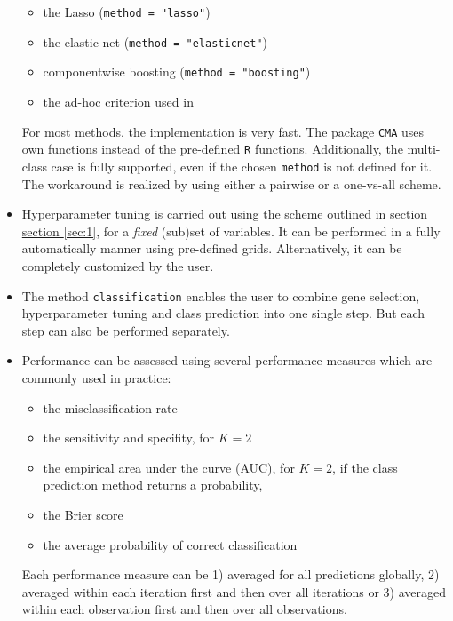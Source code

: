 \begin{itemize}
\begin{itemize}
      \item the Lasso (\texttt{method = "lasso"})
      \item the elastic net (\texttt{method = "elasticnet"}) 
      \item componentwise boosting (\texttt{method = "boosting"})                               
      \item the ad-hoc criterion used in \citet{golub1999}                                
      \end{itemize}                                
      For most methods, the implementation is very fast. The package 
     \texttt{CMA} uses own functions instead of the pre-defined
      \texttt{R} functions.
      Additionally, the multi-class case is fully supported, even if the chosen
      \texttt{method} is not defined for it. The workaround is realized by using
      either a pairwise or a one-vs-all scheme. 
\item Hyperparameter tuning is carried out using the scheme outlined in section 
      \hyperref[sec:1]{section }{\ref{sec:1}},
      for a \emph{fixed} (sub)set of variables. 
	It can be performed in a fully automatically
      manner using pre-defined grids. Alternatively, it can 
	be completely customized by the user. 
\item The method \texttt{classification} enables the user to combine gene selection,
      hyperparameter tuning and class prediction into one single step. But each step
	can also be performed separately.
\item Performance can be assessed using several performance measures
	which are commonly used in practice: 
      \begin{itemize}
      \item the misclassification rate                                         
      \item the sensitivity and specifity, for $K=2$
      \item the empirical area under the curve (AUC), for $K=2$, if the class 
	prediction method returns a probability,
      \item the Brier score
      \item the average probability of correct classification                                
      \end{itemize}                          
	Each performance measure can be 1) averaged for all predictions globally,
	2) averaged within each iteration first and then over all iterations or 
	3) averaged within each observation first and then over all observations.

\end{itemize}
